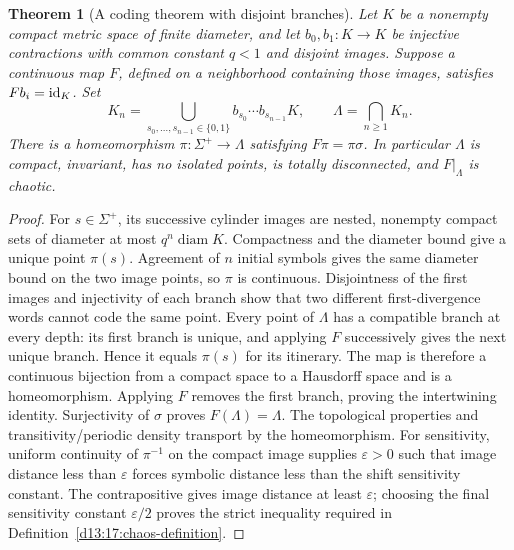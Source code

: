 \documentclass[11pt,oneside]{book}
\newtheorem{theorem}{Theorem}[chapter]
\theoremstyle{definition}
\theoremstyle{remark}\newtheorem{remark}[theorem]{Remark}
\begin{document}
\begin{theorem}[A coding theorem with disjoint branches]\label{d13:17:inverse-branch-coding}
Let \(K\) be a nonempty compact metric space of finite diameter, and
let \(b_0,b_1:K\to K\) be injective contractions with common constant
\(q<1\) and disjoint images. Suppose a continuous map \(F\), defined
on a neighborhood containing those images, satisfies \(Fb_i=\operatorname{id}_K\).
Set
\[
 K_n=\bigcup_{s_0,\ldots,s_{n-1}\in\{0,1\}}
          b_{s_0}\cdots b_{s_{n-1}}K,\qquad
 \Lambda=\bigcap_{n\geq1}K_n .
\]
There is a homeomorphism \(\pi:\Sigma^+\to\Lambda\) satisfying
\(F\pi=\pi\sigma\). In particular \(\Lambda\) is compact, invariant,
has no isolated points, is totally disconnected, and \(F|_\Lambda\)
is chaotic.
\end{theorem}
\begin{proof}
For \(s\in\Sigma^+\), its successive cylinder images are nested,
nonempty compact sets of diameter at most \(q^n\operatorname{diam}K\).
Compactness and the diameter bound give a unique point \(\pi(s)\).
Agreement of \(n\) initial symbols gives the same diameter bound on
the two image points, so \(\pi\) is continuous.
Disjointness of the first images and injectivity of each branch show
that two different first-divergence words cannot code the same point.
Every point of \(\Lambda\) has a compatible branch at every depth:
its first branch is unique, and applying \(F\) successively gives the
next unique branch. Hence it equals \(\pi(s)\) for its itinerary.
The map is therefore a continuous bijection from a compact space to a
Hausdorff space and is a homeomorphism.
Applying \(F\) removes the first branch, proving the intertwining
identity. Surjectivity of \(\sigma\) proves \(F(\Lambda)=\Lambda\).
The topological properties and transitivity/periodic density transport
by the homeomorphism. For sensitivity, uniform continuity of
\(\pi^{-1}\) on the compact image supplies \(\varepsilon>0\) such that
image distance less than \(\varepsilon\) forces symbolic distance
less than the shift sensitivity constant. The contrapositive gives
image distance at least \(\varepsilon\); choosing the final
sensitivity constant \(\varepsilon/2\) proves the strict inequality
required in Definition~\ref{d13:17:chaos-definition}.
\end{proof}
\end{document}
